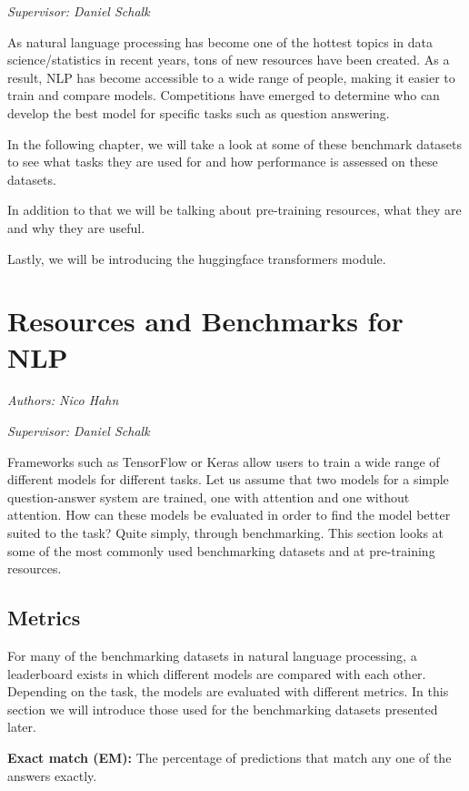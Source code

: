 \documentclass[]{krantz}
\begin{document}
\emph{Supervisor: Daniel Schalk}

As natural language processing has become one of the hottest topics in data science/statistics in recent years, tons of new resources have been created. As a result, NLP has become accessible to a wide range of people, making it easier to train and compare models. Competitions have emerged to determine who can develop the best model for specific tasks such as question answering.

In the following chapter, we will take a look at some of these benchmark datasets to see what tasks they are used for and how performance is assessed on these datasets.

In addition to that we will be talking about pre-training resources, what they are and why they are useful.

Lastly, we will be introducing the huggingface transformers module.

\hypertarget{resources-and-benchmarks-for-nlp}{%
\chapter{Resources and Benchmarks for NLP}\label{resources-and-benchmarks-for-nlp}}

\emph{Authors: Nico Hahn}

\emph{Supervisor: Daniel Schalk}

Frameworks such as TensorFlow or Keras allow users to train a wide range of different models for different tasks. Let us assume that two models for a simple question-answer system are trained, one with attention and one without attention. How can these models be evaluated in order to find the model better suited to the task? Quite simply, through benchmarking. This section looks at some of the most commonly used benchmarking datasets and at pre-training resources.

\hypertarget{metrics}{%
\section{Metrics}\label{metrics}}

For many of the benchmarking datasets in natural language processing, a leaderboard exists in which different models are compared with each other. Depending on the task, the models are evaluated with different metrics. In this section we will introduce those used for the benchmarking datasets presented later.

\textbf{Exact match (EM):} The percentage of predictions that match any one of the answers exactly.
\end{document}
